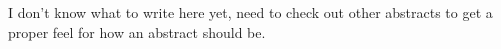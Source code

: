 I don't know what to write here yet, need to check out other abstracts to get a proper feel for how an abstract should be. 